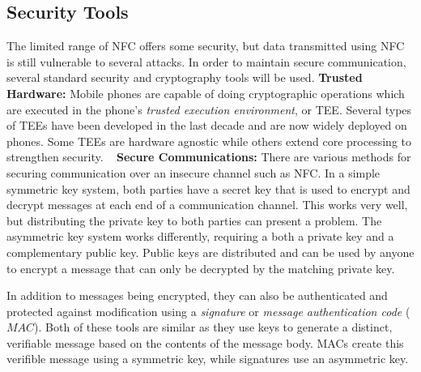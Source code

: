 \documentclass{sig-alternate}
\begin{document}
\subsection{Security Tools}
The limited range of NFC offers some security, but data transmitted using NFC is still vulnerable to several attacks. In order to maintain secure communication, several standard security and cryptography tools will be used.
\vspace{2mm}\newline
\noindent\textbf{Trusted Hardware:}
Mobile phones are capable of doing cryptographic operations which are executed in the phone's \textit{trusted execution environment}, or TEE. Several types of TEEs have been developed in the last decade and are now widely deployed on phones. Some TEEs are hardware agnostic while others extend core processing to strengthen security.
~\cite{Ticket2011}
\vspace{2mm}\newline
\textbf{Secure Communications:}
There are various methods for securing communication over an insecure channel such as NFC. In a simple symmetric key system, both parties have a secret key that is used to encrypt and decrypt messages at each end of a communication channel. This works very well, but distributing the private key to both parties can present a problem. The asymmetric key system works differently, requiring a both a private key and a complementary public key. Public keys are distributed and can be used by anyone to encrypt a message that can only be decrypted by the matching private key.

In addition to messages being encrypted, they can also be authenticated and protected against modification using a \textit{signature} or \textit{message authentication code} ($MAC$). Both of these tools are similar as they use keys to generate a distinct, verifiable message based on the contents of the message body. MACs create this verifible message using a symmetric key, while signatures use an asymmetric key.\cite{crypto}
\end{document}
